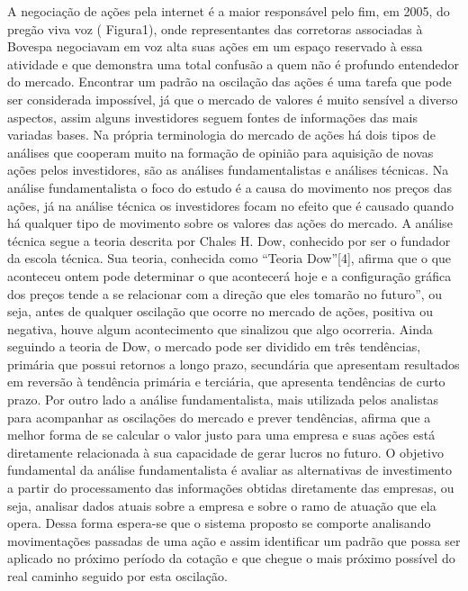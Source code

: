 \documentclass[brazil,twocolumn]{svjour3}
\begin{document}
A negociação de ações pela internet é a maior responsável pelo fim, em 2005, do pregão viva voz ( Figura1), onde representantes das corretoras associadas à Bovespa negociavam em voz alta suas ações em um espaço reservado à essa atividade e que demonstra uma total confusão a quem não é profundo entendedor do mercado.
Encontrar um padrão na oscilação das ações é uma tarefa que pode ser considerada impossível, já que o mercado de valores é muito sensível a diverso aspectos, assim alguns investidores seguem fontes de informações das mais variadas bases. Na própria terminologia do mercado de ações há dois tipos de análises que cooperam muito na formação de opinião para aquisição de novas ações pelos investidores, são as análises fundamentalistas e análises técnicas.
Na análise fundamentalista o foco do estudo é a causa do movimento nos preços das ações, já na análise técnica os investidores focam no efeito que é causado quando há qualquer tipo de movimento sobre os valores das ações do mercado.
A análise técnica segue a teoria descrita por Chales H. Dow, conhecido por ser o fundador da escola técnica. Sua teoria, conhecida como “Teoria Dow”[4], afirma que o que aconteceu ontem pode determinar o que acontecerá hoje e a configuração gráfica dos preços tende a se relacionar com a direção que eles tomarão no futuro”, ou seja, antes de qualquer oscilação que ocorre no mercado de ações, positiva ou negativa, houve algum acontecimento que sinalizou que algo ocorreria.
Ainda seguindo a teoria de Dow, o mercado pode ser dividido em três tendências, primária que possui retornos a longo prazo, secundária que apresentam resultados em reversão à tendência primária e terciária, que apresenta tendências de curto prazo.
Por outro lado a análise fundamentalista, mais utilizada pelos analistas para acompanhar as oscilações do mercado e prever tendências, afirma que a melhor forma de se calcular o valor justo para uma empresa e suas ações está diretamente relacionada à sua capacidade de gerar lucros no futuro. O objetivo fundamental da análise fundamentalista é avaliar as alternativas de investimento a partir do processamento das informações obtidas diretamente das empresas, ou seja, analisar dados atuais sobre a empresa e sobre o ramo de atuação que ela opera.
Dessa forma espera-se que o sistema proposto se comporte analisando movimentações passadas de uma ação e assim identificar um padrão que possa ser aplicado no próximo período da cotação e que chegue o mais próximo possível do real caminho seguido por esta oscilação.
\end{document}
